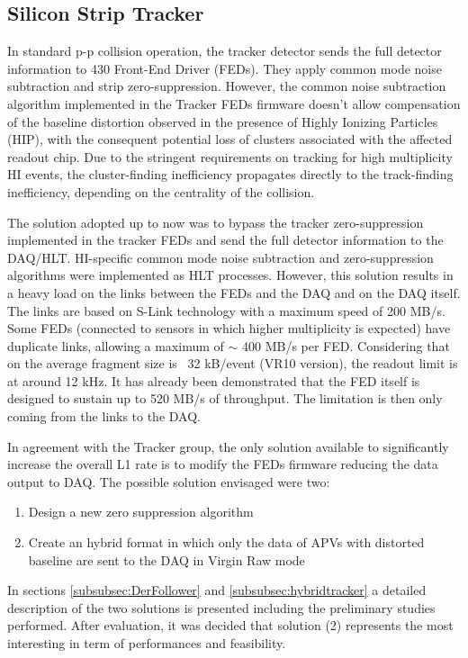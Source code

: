 \subsection{Silicon Strip Tracker\label{subsec:SiTracker}} 
In standard p-p collision operation, the tracker detector sends the full detector information to 430 Front-End Driver (FEDs). 
They apply common mode noise subtraction and strip zero-suppression. However, the common noise subtraction algorithm implemented in the Tracker FEDs firmware doesn't allow
compensation of the baseline distortion observed in the presence of Highly Ionizing Particles (HIP), with the consequent
potential loss of clusters associated with the affected readout chip. Due to the stringent requirements on tracking for
high multiplicity HI events, the cluster-finding inefficiency propagates directly to the track-finding inefficiency,
depending on the centrality of the collision.

The solution adopted up to now was to bypass the tracker zero-suppression implemented in the tracker FEDs and send the
full detector information to the DAQ/HLT. HI-specific common mode noise subtraction and zero-suppression algorithms were
implemented as HLT processes. However, this solution results in a heavy load on the links between the FEDs and the DAQ
and on the DAQ itself. The links are based on S-Link technology with a maximum speed of 200 MB/s. Some FEDs (connected
to sensors in which higher multiplicity is expected) have duplicate links, allowing a maximum of $\sim$ 400 MB/s per
FED.  Considering that on the average fragment size is ~32 kB/event (VR10 version), the readout limit is at around 12 kHz. It has
already been demonstrated that the FED itself is designed to sustain up to 520 MB/s of throughput. The limitation is
then only coming from the links to the DAQ.

In agreement with the Tracker group, the only solution available to significantly increase the overall L1 rate is to
modify the FEDs firmware reducing the data output to DAQ. The possible solution envisaged were two:

\begin{enumerate}
\item Design a new zero suppression algorithm 
\item Create an hybrid format in which only the data of APVs with distorted baseline are sent to the DAQ in Virgin Raw mode 
\end{enumerate}

In sections \ref{subsubsec:DerFollower} and \ref{subsubsec:hybridtracker} a detailed description of the two solutions is presented including the preliminary studies performed. 
After evaluation, it was decided that solution (2) represents the most interesting in term of performances and feasibility. 

